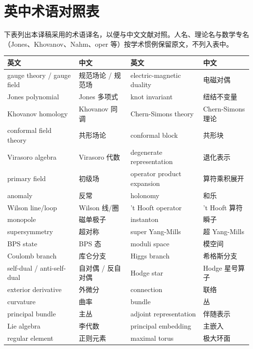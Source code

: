 \section{英中术语对照表}\label{app:glossary}

下表列出本译稿采用的术语译名，以便与中文文献对照。人名、理论名与数学专名（Jones、Khovanov、Nahm、oper 等）按学术惯例保留原文，不列入表中。

\begin{longtable}{p{}p{}p{}p{}}
\toprule
英文 & 中文 & 英文 & 中文 \\
\midrule
\endhead
gauge theory / gauge field & 规范场论 / 规范场 & electric-magnetic duality & 电磁对偶 \\
Jones polynomial & Jones 多项式 & knot invariant & 纽结不变量 \\
Khovanov homology & Khovanov 同调 & Chern-Simons theory & Chern-Simons 理论 \\
conformal field theory & 共形场论 & conformal block & 共形块 \\
Virasoro algebra & Virasoro 代数 & degenerate representation & 退化表示 \\
primary field & 初级场 & operator product expansion & 算符乘积展开 \\
anomaly & 反常 & holonomy & 和乐 \\
Wilson line/loop & Wilson 线/圈 & 't Hooft operator & 't Hooft 算符 \\
monopole & 磁单极子 & instanton & 瞬子 \\
supersymmetry & 超对称 & super Yang-Mills & 超 Yang-Mills \\
BPS state & BPS 态 & moduli space & 模空间 \\
Coulomb branch & 库仑分支 & Higgs branch & 希格斯分支 \\
self-dual / anti-self-dual & 自对偶 / 反自对偶 & Hodge star & Hodge 星号算子 \\
exterior derivative & 外微分 & connection & 联络 \\
curvature & 曲率 & bundle & 丛 \\
principal bundle & 主丛 & adjoint representation & 伴随表示 \\
Lie algebra & 李代数 & principal embedding & 主嵌入 \\
regular element & 正则元素 & maximal torus & 极大环面 \\

\end{longtable}
